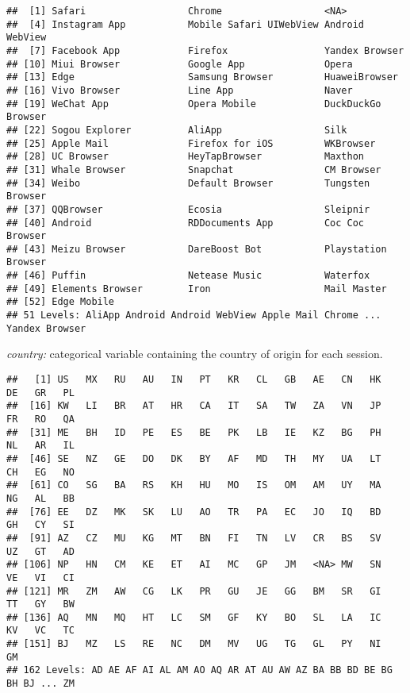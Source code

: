 \documentclass[
]{book}
\newenvironment{Shaded}{\begin{snugshade}}{\end{snugshade}}
\newcommand{\FunctionTok}[1]{\textcolor[rgb]{0.00,0.00,0.00}{#1}}
\newcommand{\NormalTok}[1]{#1}
\newcommand{\SpecialCharTok}[1]{\textcolor[rgb]{0.00,0.00,0.00}{#1}}
\begin{document}
\begin{verbatim}
##  [1] Safari                  Chrome                  <NA>                   
##  [4] Instagram App           Mobile Safari UIWebView Android WebView        
##  [7] Facebook App            Firefox                 Yandex Browser         
## [10] Miui Browser            Google App              Opera                  
## [13] Edge                    Samsung Browser         HuaweiBrowser          
## [16] Vivo Browser            Line App                Naver                  
## [19] WeChat App              Opera Mobile            DuckDuckGo Browser     
## [22] Sogou Explorer          AliApp                  Silk                   
## [25] Apple Mail              Firefox for iOS         WKBrowser              
## [28] UC Browser              HeyTapBrowser           Maxthon                
## [31] Whale Browser           Snapchat                CM Browser             
## [34] Weibo                   Default Browser         Tungsten Browser       
## [37] QQBrowser               Ecosia                  Sleipnir               
## [40] Android                 RDDocuments App         Coc Coc Browser        
## [43] Meizu Browser           DareBoost Bot           Playstation Browser    
## [46] Puffin                  Netease Music           Waterfox               
## [49] Elements Browser        Iron                    Mail Master            
## [52] Edge Mobile            
## 51 Levels: AliApp Android Android WebView Apple Mail Chrome ... Yandex Browser
\end{verbatim}

\emph{country:} categorical variable containing the country of origin for each session.

\begin{Shaded}
\end{Shaded}

\begin{verbatim}
##   [1] US   MX   RU   AU   IN   PT   KR   CL   GB   AE   CN   HK   DE   GR   PL  
##  [16] KW   LI   BR   AT   HR   CA   IT   SA   TW   ZA   VN   JP   FR   RO   QA  
##  [31] ME   BH   ID   PE   ES   BE   PK   LB   IE   KZ   BG   PH   NL   AR   IL  
##  [46] SE   NZ   GE   DO   DK   BY   AF   MD   TH   MY   UA   LT   CH   EG   NO  
##  [61] CO   SG   BA   RS   KH   HU   MO   IS   OM   AM   UY   MA   NG   AL   BB  
##  [76] EE   DZ   MK   SK   LU   AO   TR   PA   EC   JO   IQ   BD   GH   CY   SI  
##  [91] AZ   CZ   MU   KG   MT   BN   FI   TN   LV   CR   BS   SV   UZ   GT   AD  
## [106] NP   HN   CM   KE   ET   AI   MC   GP   JM   <NA> MW   SN   VE   VI   CI  
## [121] MR   ZM   AW   CG   LK   PR   GU   JE   GG   BM   SR   GI   TT   GY   BW  
## [136] AQ   MN   MQ   HT   LC   SM   GF   KY   BO   SL   LA   IC   KV   VC   TC  
## [151] BJ   MZ   LS   RE   NC   DM   MV   UG   TG   GL   PY   NI   GM  
## 162 Levels: AD AE AF AI AL AM AO AQ AR AT AU AW AZ BA BB BD BE BG BH BJ ... ZM
\end{verbatim}
\end{document}
